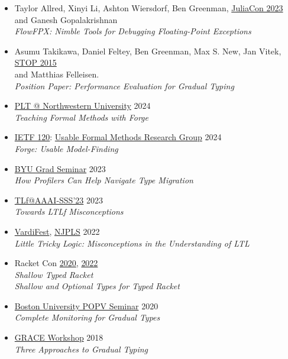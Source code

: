\documentclass[11pt]{article}
\begin{document}
\begin{itemize}
\item
  Taylor Allred, Xinyi Li, Ashton Wiersdorf, Ben Greenman, \hfill \href{https://juliacon.org/2023/}{JuliaCon 2023} \\
   and Ganesh Gopalakrishnan  \\
   \emph{FlowFPX: Nimble Tools for Debugging Floating-Point Exceptions}
\item
  Asumu Takikawa, Daniel Feltey, Ben Greenman, Max S. New, Jan Vitek, \hfill \href{https://2015.ecoop.org/track/STOP2015}{STOP 2015} \\
   and Matthias Felleisen. \\
   \emph{Position Paper: Performance Evaluation for Gradual Typing}
\end{itemize}


\begin{itemize}
  \item
    \href{https://plt.cs.northwestern.edu/}{PLT @ Northwestern University} \hfill 2024 \\
    \emph{Teaching Formal Methods with Forge}
  \item
    \href{https://www.ietf.org/meeting/120/}{IETF 120}: \href{https://datatracker.ietf.org/meeting/120/materials/agenda-120-ufmrg-03}{Usable Formal Methods Research Group} \hfill 2024 \\
    \emph{Forge: Usable Model-Finding}
  \item
    \href{https://cs.byu.edu/events/seminar-series/}{BYU Grad Seminar} \hfill 2023 \\
    \emph{How Profilers Can Help Navigate Type Migration}
  \item
    \href{https://ltlf-symposium.github.io/}{TLf@AAAI-SSS'23} \hfill 2023 \\
    \emph{Towards LTLf Misconceptions}
  \item
    \href{https://vardifest.github.io}{VardiFest}, \href{http://njpls.org/oct22.html}{NJPLS} \hfill 2022\\
    \emph{Little Tricky Logic: Misconceptions in the Understanding of LTL}
  \item
    Racket Con \hfill \href{https://con.racket-lang.org/2020}{2020}, \href{https://con.racket-lang.org/2022}{2022}\\
    \emph{Shallow Typed Racket} \\
    \emph{Shallow and Optional Types for Typed Racket}
  \item
    \href{https://www.bu.edu/cs/research/popv/seminar/}{Boston University POPV Seminar} \hfill {2020}\\
    \emph{Complete Monitoring for Gradual Types}
  \item
    \href{https://2018.splashcon.org/track/grace-2018-papers}{GRACE Workshop} \hfill 2018\\
    \emph{Three Approaches to Gradual Typing}
\end{itemize}
\end{document}
